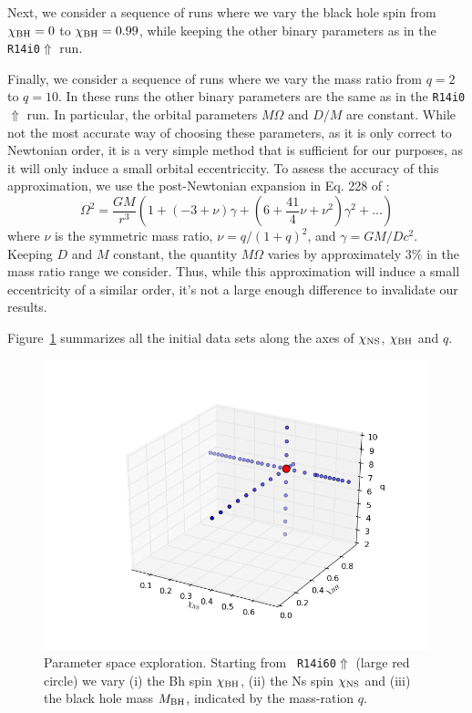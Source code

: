 Next, we consider a sequence of runs where we vary the black hole spin
from $\chi_{\rm BH}=0$ to $\chi_{\rm BH}=0.99$, while keeping the other binary parameters as in the {\tt R14i0$\Uparrow$} run.

Finally, we consider a sequence of runs where we vary the mass ratio
from $q=2$ to $q=10$. In these runs the other binary parameters are
the same as in the {\tt R14i0$\Uparrow$} run. In particular, the
orbital parameters $M\Omega$ and $D/M$ are constant. While not the
most accurate way of choosing these parameters, as it is only correct to Newtonian order, it is a very simple method
that is sufficient for our purposes, as it will only induce a small orbital eccentriccity. To assess the accuracy of this approximation, we use the post-Newtonian expansion in Eq. 228 of \cite{Blanchet2006}:
\begin{equation}
\Omega^2=\frac{GM}{r^3}\left(1+(-3+\nu)\gamma+\left(6+\frac{41}{4}\nu+\nu^2\right)\gamma^2+...\right)
\end{equation}
where $\nu$ is the symmetric mass ratio, $\nu=q/(1+q)^2$, and $\gamma=GM/Dc^2$. Keeping $D$ and $M$ constant, the quantity $M\Omega$ varies by approximately 3\% in the mass ratio range we consider.
Thus, while this approximation will induce a small eccentricity of a similar order, it's not a large enough difference to invalidate our results.

Figure~\ref{fig:3dparam} summarizes all the initial data sets along the axes of $\chi_{\rm NS}$, $\chi_{\rm BH}$ and $q$.

\begin{figure}
\includegraphics[width=0.95\columnwidth]{chap4/3dparam.png}
\caption[3d parameter space plot of Bh-Ns initial data sets.]{\label{fig:3dparam}
Parameter space exploration. Starting from {\tt
  R14i60$\Uparrow$} (large red circle) we vary (i) the Bh spin
$\chi_{\rm BH}$, (ii) the Ns spin $\chi_{\rm NS}$ and (iii) the black
hole mass $M_{\rm BH}$, indicated by the mass-ration $q$.}
\end{figure}

